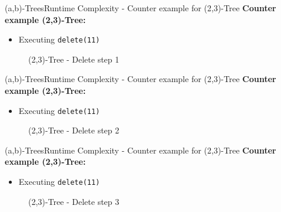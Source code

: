 \begin{frame}{(a,b)-Trees}{Runtime Complexity - Counter example for (2,3)-Tree}
  \textbf{Counter example (2,3)-Tree:}
  \begin{itemize}
  \item
    Executing \texttt{\color{MainA}delete(11)}
  \end{itemize}
  \begin{figure}
    \begin{adjustbox}{width=0.6\linewidth}
      
    \end{adjustbox}
    \label{fig:a_b_tree:2_3_tree_2}
    \caption{(2,3)-Tree - Delete step 1}
  \end{figure}
\end{frame}


\begin{frame}{(a,b)-Trees}{Runtime Complexity - Counter example for (2,3)-Tree}
  \textbf{Counter example (2,3)-Tree:}
  \begin{itemize}
    \item
      Executing \texttt{\color{MainA}delete(11)}
  \end{itemize}
  \begin{figure}
    \begin{adjustbox}{width=0.6\linewidth}
      
    \end{adjustbox}
    \label{fig:a_b_tree:2_3_tree_3}
    \caption{(2,3)-Tree - Delete step 2}
  \end{figure}
\end{frame}


\begin{frame}{(a,b)-Trees}{Runtime Complexity - Counter example for (2,3)-Tree}
  \textbf{Counter example (2,3)-Tree:}
  \begin{itemize}
    \item
      Executing \texttt{\color{MainA}delete(11)}
  \end{itemize}
  \begin{figure}
    \begin{adjustbox}{width=0.6\linewidth}
      
    \end{adjustbox}
    \label{fig:a_b_tree:2_3_tree_4}
    \caption{(2,3)-Tree - Delete step 3}
  \end{figure}
\end{frame}

